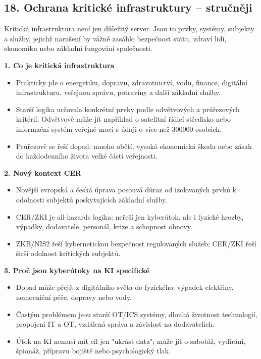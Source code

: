 
\subsection*{18. Ochrana kritické infrastruktury -- stručněji}
Kritická infrastruktura není jen důležitý server. Jsou to prvky, systémy, subjekty a služby, jejichž narušení by vážně zasáhlo bezpečnost státu, zdraví lidí, ekonomiku nebo základní fungování společnosti.

\textbf{1. Co je kritická infrastruktura}
\begin{itemize}
  \item Prakticky jde o energetiku, dopravu, zdravotnictví, vodu, finance, digitální infrastrukturu, veřejnou správu, potraviny a další základní služby.
  \item Starší logika určovala konkrétní prvky podle odvětvových a průřezových kritérií. Odvětvově může jít například o satelitní řídicí středisko nebo informační systém veřejné moci s údaji o více než 300000 osobách.
  \item Průřezově se řeší dopad: mnoho obětí, vysoká ekonomická škoda nebo zásah do každodenního života velké části veřejnosti.
\end{itemize}

\textbf{2. Nový kontext CER}
\begin{itemize}
  \item Novější evropská a česká úprava posouvá důraz od izolovaných prvků k odolnosti subjektů poskytujících základní služby.
  \item CER/ZKI je all-hazards logika: neřeší jen kyberútok, ale i fyzické hrozby, výpadky, dodavatele, personál, krize a schopnost obnovy.
  \item ZKB/NIS2 řeší kybernetickou bezpečnost regulovaných služeb; CER/ZKI řeší širší odolnost kritických subjektů.
\end{itemize}

\textbf{3. Proč jsou kyberútoky na KI specifické}
\begin{itemize}
  \item Dopad může přejít z digitálního světa do fyzického: výpadek elektřiny, nemocniční péče, dopravy nebo vody.
  \item Častým problémem jsou starší OT/ICS systémy, dlouhá životnost technologií, propojení IT a OT, vzdálená správa a závislost na dodavatelích.
  \item Útok na KI nemusí mít cíl jen "ukrást data"; může jít o sabotáž, vydírání, špionáž, přípravu bojiště nebo psychologický tlak.
\end{itemize}

